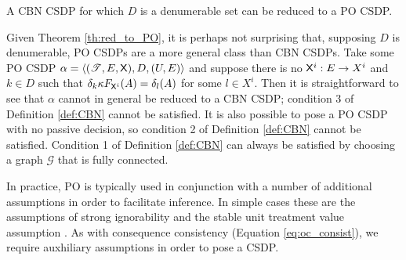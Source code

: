 \begin{corollary}
A CBN CSDP for which $D$ is a denumerable set can be reduced to a PO CSDP.
\end{corollary}

Given Theorem \ref{th:red_to_PO}, it is perhaps not surprising that, supposing $D$ is denumerable, PO CSDPs are a more general class than CBN CSDPs. Take some PO CSDP $\alpha=\langle (\mathscr{T},E,\mathsf{X}),D,(U,E) \rangle$ and suppose there is no $\mathsf{X}^i:E\to X^i$ and $k\in D$ such that $\delta_k\kappa F_{\mathsf{X}^i} (A) = \delta_{l} (A)$ for some $l\in X^i$. Then it is straightforward to see that $\alpha$ cannot in general be reduced to a CBN CSDP; condition 3 of Definition \ref{def:CBN} cannot be satisfied. It is also possible to pose a PO CSDP with no passive decision, so condition 2 of Definition \ref{def:CBN} cannot be satisfied. Condition 1 of Definition \ref{def:CBN} can always be satisfied by choosing a graph $\mathcal{G}$ that is fully connected.

In practice, PO is typically used in conjunction with a number of additional assumptions in order to facilitate inference. In simple cases these are the assumptions of strong ignorability and the stable unit treatment value assumption \citep{rubin_causal_2005}. As with consequence consistency (Equation \ref{eq:oc_consist}), we require auxhiliary assumptions in order to pose a CSDP. 

